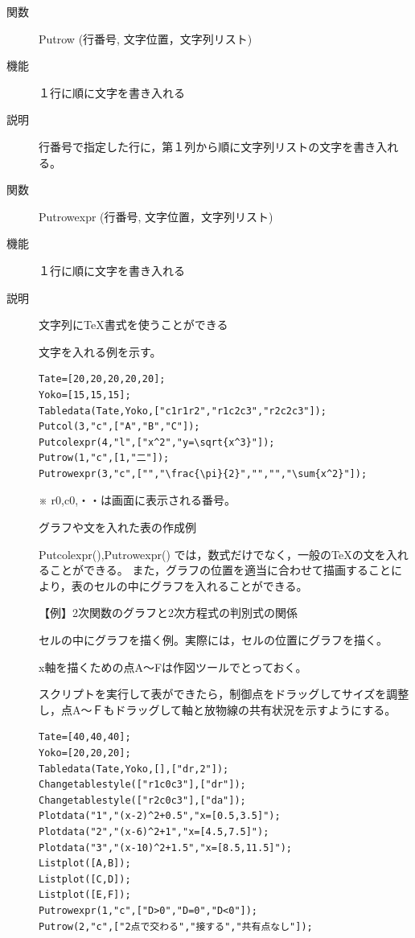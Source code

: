 \documentclass[papersize,a4paper,12pt,uplatex]{jsarticle}
\begin{document}
\begin{description}
\vspace{\baselineskip}
\hypertarget{putrow}{}
\item[関数]Putrow (行番号, 文字位置，文字列リスト)
\item[機能]１行に順に文字を書き入れる
\item[説明]行番号で指定した行に，第１列から順に文字列リストの文字を書き入れる。


\vspace{\baselineskip}
\hypertarget{putrowexpr}{}
\item[関数]Putrowexpr (行番号, 文字位置，文字列リスト)
\item[機能]１行に順に文字を書き入れる
\item[説明]文字列に\TeX 書式を使うことができる

文字を入れる例を示す。
\begin{verbatim}
Tate=[20,20,20,20,20];
Yoko=[15,15,15];
Tabledata(Tate,Yoko,["c1r1r2","r1c2c3","r2c2c3"]);
Putcol(3,"c",["A","B","C"]);
Putcolexpr(4,"l",["x^2","y=\sqrt{x^3}"]);
Putrow(1,"c",[1,"二"]);
Putrowexpr(3,"c",["","\frac{\pi}{2}","","","\sum{x^2}"]);
\end{verbatim}
 \vspace{\baselineskip}
\begin{center}  \end{center}

※ r0,c0,・・は画面に表示される番号。

グラフや文を入れた表の作成例

Putcolexpr(),Putrowexpr() では，数式だけでなく，一般の\TeX の文を入れることができる。
また，グラフの位置を適当に合わせて描画することにより，表のセルの中にグラフを入れることができる。

\vspace{\baselineskip}
【例】2次関数のグラフと2次方程式の判別式の関係

セルの中にグラフを描く例。実際には，セルの位置にグラフを描く。

x軸を描くための点A〜Fは作図ツールでとっておく。

スクリプトを実行して表ができたら，制御点をドラッグしてサイズを調整し，点A〜Ｆもドラッグして軸と放物線の共有状況を示すようにする。

\vspace{\baselineskip}
\begin{verbatim}
Tate=[40,40,40];
Yoko=[20,20,20];
Tabledata(Tate,Yoko,[],["dr,2"]);
Changetablestyle(["r1c0c3"],["dr"]);
Changetablestyle(["r2c0c3"],["da"]);
Plotdata("1","(x-2)^2+0.5","x=[0.5,3.5]");
Plotdata("2","(x-6)^2+1","x=[4.5,7.5]");
Plotdata("3","(x-10)^2+1.5","x=[8.5,11.5]");
Listplot([A,B]);
Listplot([C,D]);
Listplot([E,F]);
Putrowexpr(1,"c",["D>0","D=0","D<0"]);
Putrow(2,"c",["2点で交わる","接する","共有点なし"]);
\end{verbatim}


\end{description}
\end{document}
